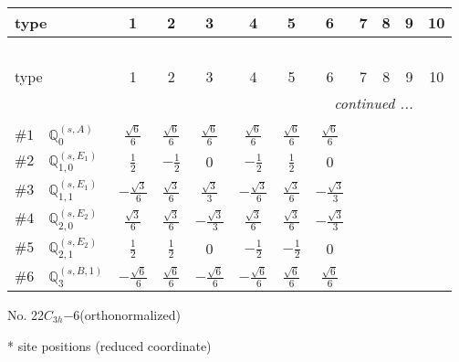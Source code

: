 \documentclass[fleqn,9pt,landscape]{jsarticle}
\begin{document}
\begin{center}
\renewcommand{\arraystretch}{1.3}
\begin{longtable}{lcccccccccc}
 \hline \hline
type & 1 & 2 & 3 & 4 & 5 & 6 & 7 & 8 & 9 & 10 \\ \hline \endfirsthead

\multicolumn{10}{l}{\tablename\ \thetable{}} \\
 \hline \hline
type & 1 & 2 & 3 & 4 & 5 & 6 & 7 & 8 & 9 & 10 \\ \hline \endhead

 \hline \hline
\multicolumn{10}{r}{\footnotesize\it continued ...} \\ \endfoot

 \hline \hline
\multicolumn{10}{r}{} \\ \endlastfoot

$ \#1\quad \mathbb{Q}_{0}^{(s,A)} $ & $ \frac{\sqrt{6}}{6} $ & $ \frac{\sqrt{6}}{6} $ & $ \frac{\sqrt{6}}{6} $ & $ \frac{\sqrt{6}}{6} $ & $ \frac{\sqrt{6}}{6} $ & $ \frac{\sqrt{6}}{6} $ \\ \hline
$ \#2\quad \mathbb{Q}_{1,0}^{(s,E_{1})} $ & $ \frac{1}{2} $ & $ - \frac{1}{2} $ & $ 0 $ & $ - \frac{1}{2} $ & $ \frac{1}{2} $ & $ 0 $ \\ \hline
$ \#3\quad \mathbb{Q}_{1,1}^{(s,E_{1})} $ & $ - \frac{\sqrt{3}}{6} $ & $ \frac{\sqrt{3}}{6} $ & $ \frac{\sqrt{3}}{3} $ & $ - \frac{\sqrt{3}}{6} $ & $ \frac{\sqrt{3}}{6} $ & $ - \frac{\sqrt{3}}{3} $ \\ \hline
$ \#4\quad \mathbb{Q}_{2,0}^{(s,E_{2})} $ & $ \frac{\sqrt{3}}{6} $ & $ \frac{\sqrt{3}}{6} $ & $ - \frac{\sqrt{3}}{3} $ & $ \frac{\sqrt{3}}{6} $ & $ \frac{\sqrt{3}}{6} $ & $ - \frac{\sqrt{3}}{3} $ \\ \hline
$ \#5\quad \mathbb{Q}_{2,1}^{(s,E_{2})} $ & $ \frac{1}{2} $ & $ \frac{1}{2} $ & $ 0 $ & $ - \frac{1}{2} $ & $ - \frac{1}{2} $ & $ 0 $ \\ \hline
$ \#6\quad \mathbb{Q}_{3}^{(s,B,1)} $ & $ - \frac{\sqrt{6}}{6} $ & $ \frac{\sqrt{6}}{6} $ & $ - \frac{\sqrt{6}}{6} $ & $ - \frac{\sqrt{6}}{6} $ & $ \frac{\sqrt{6}}{6} $ & $ \frac{\sqrt{6}}{6} $ \\
\end{longtable}
\end{center}
\newpage
\begin{center}
\LARGE
No. 22\quad$C_{3h}$\quad$-6$\quad[ hexagonal ] (orthonormalized)
\end{center}
\vspace{5mm}
* site positions (reduced coordinate)
\end{document}
